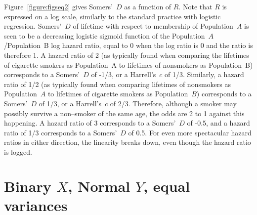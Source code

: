 \documentclass[a4paper,notitlepage]{article}      %
\begin{document}
Figure~\ref{figure:figseq2} gives Somers'~$D$ as a function of $R$.
Note that $R$ is expressed on a log scale, similarly to the standard practice with logistic regression.
Somers'~$D$ of lifetime with respect to membership of Population~$A$
is seen to be a decreasing logistic sigmoid function of the Population~$A$/Population~B log hazard ratio,
equal to 0 when the log ratio is 0 and the ratio is therefore 1.
A hazard ratio of 2 (as typically found when comparing the lifetimes of cigarette smokers as Population~A to lifetimes of nonsmokers as Population~B)
corresponds to a Somers'~$D$ of -1/3, or a Harrell's~$c$ of 1/3.
Similarly, a hazard ratio of 1/2 (as typically found when comparing lifetimes of nonsmokers as Population~$A$ to lifetimes of cigarette smokers as Population~$B$)
corresponds to a Somers'~$D$ of 1/3, or a Harrell's~$c$ of 2/3.
Therefore, although a smoker may possibly survive a non--smoker of the same age,
the odds are 2 to 1 against this happening. A hazard ratio of 3 corresponds to a Somers'~$D$ of -0.5,
and a hazard ratio of 1/3 corresponds to a Somers'~$D$ of 0.5.
For even more spectacular hazard ratios in either direction,
the linearity breaks down, even though the hazard ratio is logged.

\section{Binary $X$, Normal $Y$, equal variances}
\end{document}
